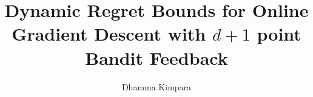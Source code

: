 \documentclass{article}
\theoremstyle{definition}
\begin{document}
\title{Dynamic Regret Bounds for Online Gradient Descent with $d+1$ point Bandit Feedback}
 \author{Dhamma Kimpara}

\maketitle







\newpage




\newpage

\appendix


\end{document}
